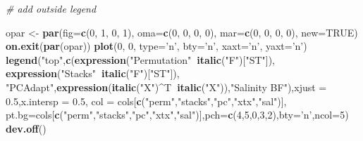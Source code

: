 \documentclass[]{article}
\newenvironment{Shaded}{\begin{snugshade}}{\end{snugshade}}
\newcommand{\KeywordTok}[1]{\textcolor[rgb]{0.13,0.29,0.53}{\textbf{#1}}}
\newcommand{\DataTypeTok}[1]{\textcolor[rgb]{0.13,0.29,0.53}{#1}}
\newcommand{\DecValTok}[1]{\textcolor[rgb]{0.00,0.00,0.81}{#1}}
\newcommand{\FloatTok}[1]{\textcolor[rgb]{0.00,0.00,0.81}{#1}}
\newcommand{\StringTok}[1]{\textcolor[rgb]{0.31,0.60,0.02}{#1}}
\newcommand{\CommentTok}[1]{\textcolor[rgb]{0.56,0.35,0.01}{\textit{#1}}}
\newcommand{\OtherTok}[1]{\textcolor[rgb]{0.56,0.35,0.01}{#1}}
\newcommand{\OperatorTok}[1]{\textcolor[rgb]{0.81,0.36,0.00}{\textbf{#1}}}
\newcommand{\NormalTok}[1]{#1}
\begin{document}
\begin{Shaded}
\begin{Highlighting}[]
\CommentTok{# add outside legend}

\NormalTok{opar <-}\StringTok{ }\KeywordTok{par}\NormalTok{(}\DataTypeTok{fig=}\KeywordTok{c}\NormalTok{(}\DecValTok{0}\NormalTok{, }\DecValTok{1}\NormalTok{, }\DecValTok{0}\NormalTok{, }\DecValTok{1}\NormalTok{), }\DataTypeTok{oma=}\KeywordTok{c}\NormalTok{(}\DecValTok{0}\NormalTok{, }\DecValTok{0}\NormalTok{, }\DecValTok{0}\NormalTok{, }\DecValTok{0}\NormalTok{),}
            \DataTypeTok{mar=}\KeywordTok{c}\NormalTok{(}\DecValTok{0}\NormalTok{, }\DecValTok{0}\NormalTok{, }\DecValTok{0}\NormalTok{, }\DecValTok{0}\NormalTok{), }\DataTypeTok{new=}\OtherTok{TRUE}\NormalTok{)}
\KeywordTok{on.exit}\NormalTok{(}\KeywordTok{par}\NormalTok{(opar))}
\KeywordTok{plot}\NormalTok{(}\DecValTok{0}\NormalTok{, }\DecValTok{0}\NormalTok{, }\DataTypeTok{type=}\StringTok{'n'}\NormalTok{, }\DataTypeTok{bty=}\StringTok{'n'}\NormalTok{, }\DataTypeTok{xaxt=}\StringTok{'n'}\NormalTok{, }\DataTypeTok{yaxt=}\StringTok{'n'}\NormalTok{)}
\KeywordTok{legend}\NormalTok{(}\StringTok{"top"}\NormalTok{,}\KeywordTok{c}\NormalTok{(}\KeywordTok{expression}\NormalTok{(}\StringTok{"Permutation"}\OperatorTok{~}\KeywordTok{italic}\NormalTok{(}\StringTok{"F"}\NormalTok{)[}\StringTok{"ST"}\NormalTok{]),}
         \KeywordTok{expression}\NormalTok{(}\StringTok{"Stacks"}\OperatorTok{~}\KeywordTok{italic}\NormalTok{(}\StringTok{"F"}\NormalTok{)[}\StringTok{"ST"}\NormalTok{]),}
         \StringTok{"PCAdapt"}\NormalTok{,}\KeywordTok{expression}\NormalTok{(}\KeywordTok{italic}\NormalTok{(}\StringTok{"X"}\NormalTok{)}\OperatorTok{^}\NormalTok{T}\OperatorTok{~}\KeywordTok{italic}\NormalTok{(}\StringTok{"X"}\NormalTok{)),}\StringTok{"Salinity BF"}\NormalTok{),}\DataTypeTok{xjust =} \FloatTok{0.5}\NormalTok{,}\DataTypeTok{x.intersp =} \FloatTok{0.5}\NormalTok{,}
       \DataTypeTok{col =}\NormalTok{ cols[}\KeywordTok{c}\NormalTok{(}\StringTok{"perm"}\NormalTok{,}\StringTok{"stacks"}\NormalTok{,}\StringTok{"pc"}\NormalTok{,}\StringTok{"xtx"}\NormalTok{,}\StringTok{"sal"}\NormalTok{)],}
       \DataTypeTok{pt.bg=}\NormalTok{cols[}\KeywordTok{c}\NormalTok{(}\StringTok{"perm"}\NormalTok{,}\StringTok{"stacks"}\NormalTok{,}\StringTok{"pc"}\NormalTok{,}\StringTok{"xtx"}\NormalTok{,}\StringTok{"sal"}\NormalTok{)],}\DataTypeTok{pch=}\KeywordTok{c}\NormalTok{(}\DecValTok{4}\NormalTok{,}\DecValTok{5}\NormalTok{,}\DecValTok{0}\NormalTok{,}\DecValTok{3}\NormalTok{,}\DecValTok{2}\NormalTok{),}\DataTypeTok{bty=}\StringTok{'n'}\NormalTok{,}\DataTypeTok{ncol=}\DecValTok{5}\NormalTok{)}
\KeywordTok{dev.off}\NormalTok{()}
\end{Highlighting}
\end{Shaded}
\end{document}
